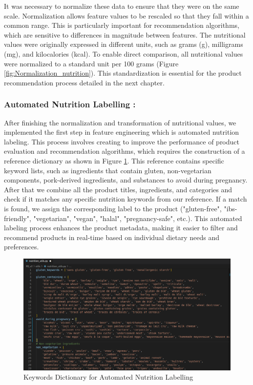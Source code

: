 \par It was necessary to normalize these data to ensure that they were on
the same scale. Normalization allows feature values to be rescaled so
that they fall within a common range. This is particularly important
for recommendation algorithms, which are sensitive to differences in
magnitude between features. The nutritional values were originally expressed in different units, such as
grams (g), milligrams (mg), and kilocalories (kcal). To enable direct comparison, all nutritional values were normalized to a standard unit per 100 grams (Figure \ref{fig:Normalization_nutrition}). This standardization is essential for the product recommendation process detailed in the next chapter.

\subsubsection{Automated Nutrition Labelling :}

\par After finishing the normalization and transformation of nutritional values, we implemented the first step in feature engineering which is automated nutrition labeling. 
This process involves creating to improve the performance of product evaluation and recommendation algorithms, which requires the construction of a reference dictionary as shown in Figure \ref{fig:nutrition_utils_file}. This reference contains specific keyword lists, such as ingredients that contain gluten, non-vegetarian components, pork-derived ingredients, and substances to avoid during pregnancy. After that we combine all the product titles, ingredients, and categories and check if it matches any specific nutrition keywords from our reference. 
If a match is found, we assign the corresponding label to the product ("gluten-free", "ibs-friendly", "vegetarian", "vegan", "halal", "pregnancy-safe", etc.). This automated labeling process enhances the product metadata, making it easier to filter and recommend products in real-time based on individual dietary needs and preferences.

\begin{center}
\begin{figure}[H]
    \includegraphics[scale=0.45]{images/nutrition_utils.png}
    \caption{Keywords Dictionary for Automated Nutrition Labelling} 
    \label{fig:nutrition_utils_file}
\end{figure}
\end{center}

